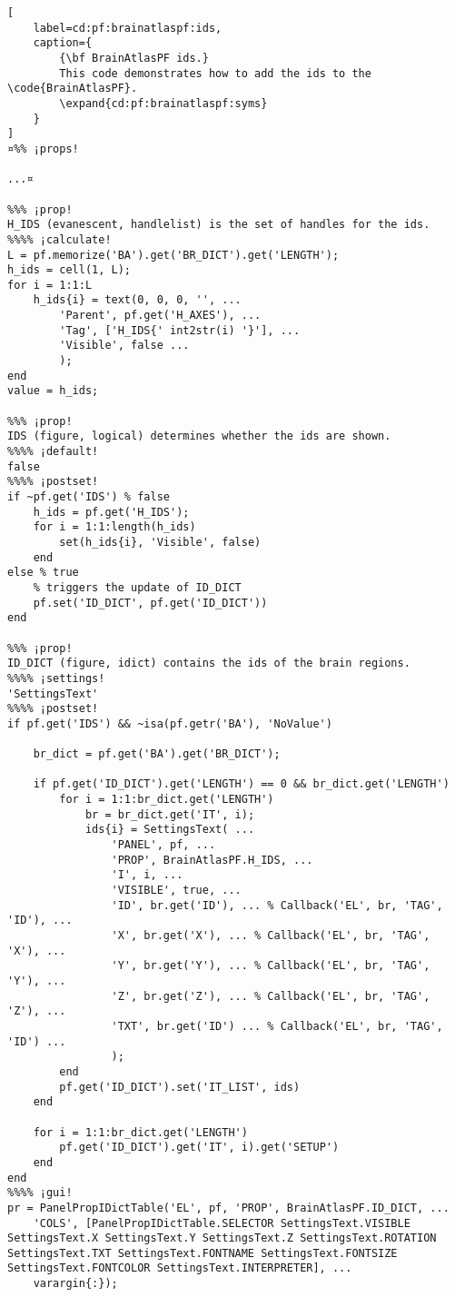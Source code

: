\documentclass{tufte-handout}
\begin{document}
\begin{lstlisting}[
	label=cd:pf:brainatlaspf:ids,
	caption={
		{\bf BrainAtlasPF ids.}
		This code demonstrates how to add the ids to the \code{BrainAtlasPF}.
		\expand{cd:pf:brainatlaspf:syms}
	}
]
¤%% ¡props!
 
...¤

%%% ¡prop!
H_IDS (evanescent, handlelist) is the set of handles for the ids.
%%%% ¡calculate!
L = pf.memorize('BA').get('BR_DICT').get('LENGTH');
h_ids = cell(1, L);
for i = 1:1:L
    h_ids{i} = text(0, 0, 0, '', ...
        'Parent', pf.get('H_AXES'), ...
        'Tag', ['H_IDS{' int2str(i) '}'], ...
        'Visible', false ...
        );
end
value = h_ids;

%%% ¡prop!
IDS (figure, logical) determines whether the ids are shown.
%%%% ¡default!
false
%%%% ¡postset!
if ~pf.get('IDS') % false
    h_ids = pf.get('H_IDS');
    for i = 1:1:length(h_ids)
        set(h_ids{i}, 'Visible', false)
    end        
else % true
    % triggers the update of ID_DICT
    pf.set('ID_DICT', pf.get('ID_DICT'))
end

%%% ¡prop!
ID_DICT (figure, idict) contains the ids of the brain regions.
%%%% ¡settings!
'SettingsText'
%%%% ¡postset!
if pf.get('IDS') && ~isa(pf.getr('BA'), 'NoValue')

    br_dict = pf.get('BA').get('BR_DICT');

    if pf.get('ID_DICT').get('LENGTH') == 0 && br_dict.get('LENGTH')
        for i = 1:1:br_dict.get('LENGTH')
            br = br_dict.get('IT', i);
            ids{i} = SettingsText( ...
                'PANEL', pf, ...
                'PROP', BrainAtlasPF.H_IDS, ...
                'I', i, ...
                'VISIBLE', true, ...
                'ID', br.get('ID'), ... % Callback('EL', br, 'TAG', 'ID'), ...
                'X', br.get('X'), ... % Callback('EL', br, 'TAG', 'X'), ...
                'Y', br.get('Y'), ... % Callback('EL', br, 'TAG', 'Y'), ...
                'Z', br.get('Z'), ... % Callback('EL', br, 'TAG', 'Z'), ...
                'TXT', br.get('ID') ... % Callback('EL', br, 'TAG', 'ID') ...
                );
        end
        pf.get('ID_DICT').set('IT_LIST', ids)
    end
    
    for i = 1:1:br_dict.get('LENGTH')
        pf.get('ID_DICT').get('IT', i).get('SETUP')
    end
end
%%%% ¡gui!
pr = PanelPropIDictTable('EL', pf, 'PROP', BrainAtlasPF.ID_DICT, ...
    'COLS', [PanelPropIDictTable.SELECTOR SettingsText.VISIBLE SettingsText.X SettingsText.Y SettingsText.Z SettingsText.ROTATION SettingsText.TXT SettingsText.FONTNAME SettingsText.FONTSIZE SettingsText.FONTCOLOR SettingsText.INTERPRETER], ...
    varargin{:});


\end{lstlisting}
\end{document}
